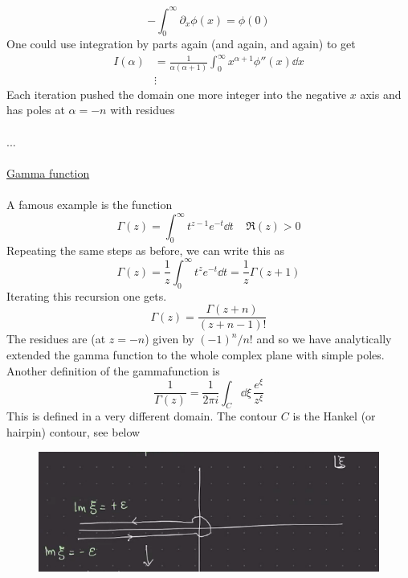 \documentclass[a4paper,12pt]{article}
\begin{document}
\begin{equation}
-\int_0^\infty \partial_x\phi(x)=\phi(0)
\end{equation}
One could use integration by parts again (and again, and again) to get
\begin{equation}
\begin{aligned}
I(\alpha)&=\frac{1}{\alpha(\alpha+1)}\int_{0}^{\infty}x^{\alpha+1}\phi''(x)\dd x
\\
&\vdots
\end{aligned}
\end{equation}
Each iteration pushed the domain one more integer into the negative $x$ axis and has poles at $\alpha=-n$ with residues \\\\
...\\\\
\underline{Gamma function}\\\\
A famous example is the function
\begin{equation}
\Gamma(z)=\int_0^{\infty}t^{z-1}e^{-t}\dd t~~~~~\Re(z)>0
\end{equation}
Repeating the same steps as before, we can write this as
\begin{equation}
	\Gamma(z)= \frac{1}{z}\int_0^{\infty}t^{z}e^{-t}\dd t=\frac{1}{z}\Gamma(z+1)
\end{equation}
Iterating this recursion one gets.
\begin{equation}
\Gamma(z)=\frac{\Gamma(z+n)}{(z+n-1)!}
\end{equation}
The residues are (at $z=-n$) given by $(-1)^n/n!$ and so we have analytically extended the gamma function to the whole complex plane with simple poles. Another definition of the gammafunction is
\begin{equation}
\frac{1}{\Gamma(z)}=\frac{1}{2\pi i}\int_C \dd \xi\, \frac{e^\xi}{z^\xi}
\end{equation}
This is defined in a very different domain. The contour $C$ is the Hankel (or hairpin) contour, see below
\begin{figure}[H]
	\centering
	\includegraphics[width=0.7\linewidth]{20}
	\caption{}
	\label{fig:4}
\end{figure}
\end{document}
